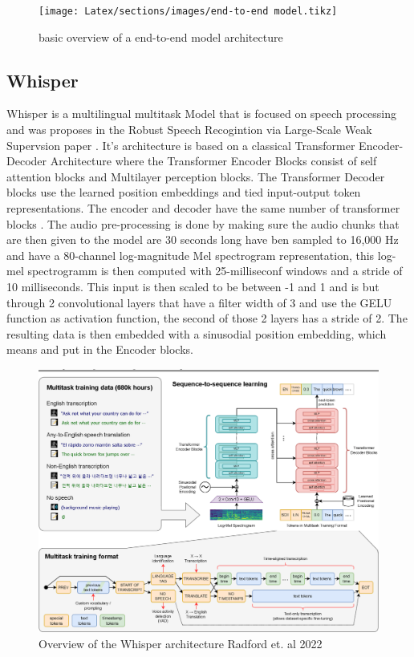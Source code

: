 \begin{figure}
    \centering%
    \texttt{[image: Latex/sections/images/end-to-end model.tikz]}

\caption{basic overview of a end-to-end model architecture}
\label{fig:end-to-end models}
\end{figure}


\subsection{Whisper}
Whisper is a multilingual multitask Model that is focused on speech processing and was proposes in the Robust Speech Recogintion via Large-Scale Weak Supervsion paper \cite{radford2022robust}. 
It's architecture is based on a classical Transformer Encoder-Decoder Architecture where the Transformer Encoder Blocks consist of self attention blocks and Multilayer perception blocks. 
The Transformer Decoder blocks use the learned position embeddings and tied input-output token representations. 
The encoder and decoder have the same number of transformer blocks .
The audio pre-processing is done by making sure the audio chunks that are then given to the model are 30 seconds long have ben sampled to 16,000 Hz and have a 80-channel log-magnitude Mel spectrogram representation, this log-mel spectrogramm is then computed with 25-milliseconf windows and a stride of 10 milliseconds. 
This input is then scaled to be between -1 and 1 and is but through 2 convolutional layers that have a filter width of 3 and use the GELU function as activation function, the second of those 2 layers has a stride of 2. 
The resulting data is then embedded with a sinusodial position embedding, which means %
and put in the Encoder blocks. 

\begin{figure}
        \centering%
        \includegraphics[width=0.5\linewidth]{Latex//sections//images/whispermodel.png}
        \caption{Overview of the Whisper architecture Radford et. al 2022}
        \label{fig:whispermodel}
    \end{figure}


